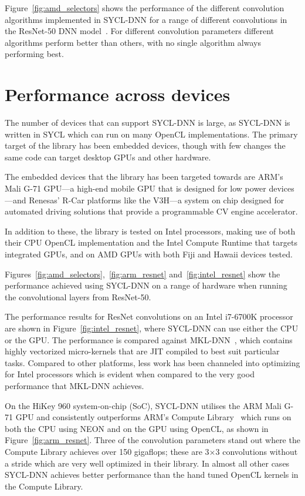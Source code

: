 \documentclass[sigconf]{acmart}
\begin{document}
Figure~\ref{fig:amd_selectors} shows the performance of the different
convolution algorithms implemented in SYCL-DNN for a range of different
convolutions in the ResNet-50 DNN model~\cite{resnet}. For different
convolution parameters different algorithms perform better than others, with no
single algorithm always performing best.

\section{Performance across devices}

The number of devices that can support SYCL-DNN is large, as SYCL-DNN is written
in SYCL which can run on many OpenCL implementations. The primary
target of the library has been embedded devices, though with few changes the
same code can target desktop GPUs and other hardware.

The embedded devices that the library has been targeted towards are ARM's Mali
G-71 GPU---a high-end mobile GPU that is designed for low power devices---and
Renesas' R-Car platforms like the V3H---a system on chip designed for automated
driving solutions that provide a programmable CV engine accelerator.

In addition to these, the library is tested on Intel processors, making use of
both their CPU OpenCL implementation and the Intel Compute Runtime that targets
integrated GPUs, and on AMD GPUs with both Fiji and Hawaii devices tested.

Figures~\ref{fig:amd_selectors},~\ref{fig:arm_resnet} and~\ref{fig:intel_resnet}
show the performance achieved using SYCL-DNN on a range of hardware when running
the convolutional layers from ResNet-50.

The performance results for ResNet convolutions on an Intel i7-6700K processor
are shown in Figure~\ref{fig:intel_resnet}, where SYCL-DNN can use either the
CPU or the GPU\@. The performance is compared against
MKL-DNN~\cite[v0.18.1]{mkl_dnn}, which contains highly vectorized micro-kernels
that are JIT compiled to best suit particular tasks. Compared to other
platforms, less work has been channeled into optimizing for Intel processors
which is evident when compared to the very good performance that MKL-DNN
achieves.

On the HiKey 960 system-on-chip (SoC), SYCL-DNN utilises the ARM Mali G-71 GPU and
consistently outperforms ARM's Compute Library~\cite[v18.11]{arm_compute} which
runs on both the CPU using NEON and on the GPU using OpenCL, as shown in
Figure~\ref{fig:arm_resnet}. Three of the convolution parameters stand out where
the Compute Library achieves over 150 gigaflops; these are 3$\times$3
convolutions without a stride which are very well optimized in their library. In
almost all other cases SYCL-DNN achieves better performance than the hand tuned
OpenCL kernels in the Compute Library.
\end{document}
